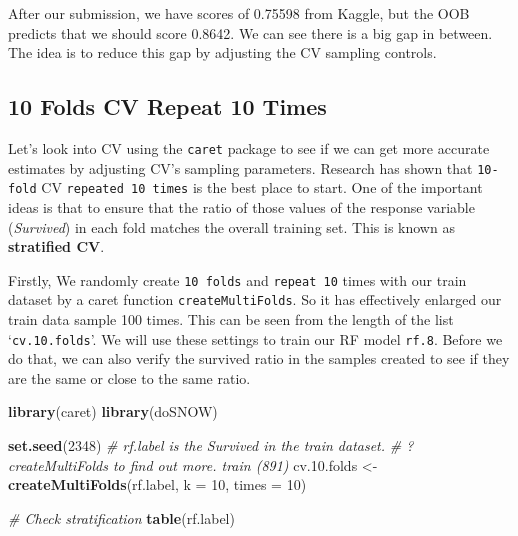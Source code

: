 \documentclass[
]{book}
\newenvironment{Shaded}{\begin{snugshade}}{\end{snugshade}}
\newcommand{\CommentTok}[1]{\textcolor[rgb]{0.56,0.35,0.01}{\textit{#1}}}
\newcommand{\DataTypeTok}[1]{\textcolor[rgb]{0.13,0.29,0.53}{#1}}
\newcommand{\DecValTok}[1]{\textcolor[rgb]{0.00,0.00,0.81}{#1}}
\newcommand{\FloatTok}[1]{\textcolor[rgb]{0.00,0.00,0.81}{#1}}
\newcommand{\KeywordTok}[1]{\textcolor[rgb]{0.13,0.29,0.53}{\textbf{#1}}}
\newcommand{\NormalTok}[1]{#1}
\newcommand{\OperatorTok}[1]{\textcolor[rgb]{0.81,0.36,0.00}{\textbf{#1}}}
\newcommand{\OtherTok}[1]{\textcolor[rgb]{0.56,0.35,0.01}{#1}}
\newcommand{\StringTok}[1]{\textcolor[rgb]{0.31,0.60,0.02}{#1}}
\begin{document}
\begin{Shaded}
\end{Shaded}

After our submission, we have scores of 0.75598 from Kaggle, but the OOB predicts that we should score 0.8642. We can see there is a big gap in between. The idea is to reduce this gap by adjusting the CV sampling controls.

\hypertarget{folds-cv-repeat-10-times}{%
\subsection*{10 Folds CV Repeat 10 Times}\label{folds-cv-repeat-10-times}}


Let's look into CV using the \texttt{caret} package to see if we can get more accurate estimates by adjusting CV's sampling parameters. Research has shown that \texttt{10-fold} CV \texttt{repeated\ 10\ times} is the best place to start. One of the important ideas is that to ensure that the ratio of those values of the response variable (\emph{Survived}) in each fold matches the overall training set. This is known as \textbf{stratified CV}.

Firstly, We randomly create \texttt{10\ folds} and \texttt{repeat\ 10} times with our train dataset by a caret function \texttt{createMultiFolds}. So it has effectively enlarged our train data sample 100 times. This can be seen from the length of the list `\texttt{cv.10.folds}'. We will use these settings to train our RF model \texttt{rf.8}. Before we do that, we can also verify the survived ratio in the samples created to see if they are the same or close to the same ratio.

\begin{Shaded}
\begin{Highlighting}[]
\KeywordTok{library}\NormalTok{(caret)}
\KeywordTok{library}\NormalTok{(doSNOW)}

\KeywordTok{set.seed}\NormalTok{(}\DecValTok{2348}\NormalTok{)}
\CommentTok{# rf.label is the Survived in the train dataset.}
\CommentTok{# ? createMultiFolds to find out more. train (891)}
\NormalTok{cv.}\FloatTok{10.}\NormalTok{folds <-}\StringTok{ }\KeywordTok{createMultiFolds}\NormalTok{(rf.label, }\DataTypeTok{k =} \DecValTok{10}\NormalTok{, }\DataTypeTok{times =} \DecValTok{10}\NormalTok{)}

\CommentTok{# Check stratification}
\KeywordTok{table}\NormalTok{(rf.label)}
\end{Highlighting}
\end{Shaded}
\end{document}
